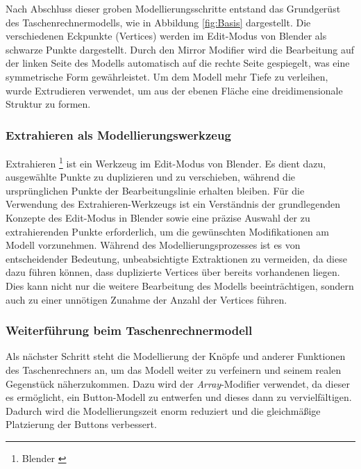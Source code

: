 Nach Abschluss dieser groben Modellierungsschritte entstand das Grundgerüst des Taschenrechnermodells, wie in
Abbildung \ref{fig:Basis} dargestellt. Die verschiedenen Eckpunkte (Vertices) werden im Edit-Modus von Blender als
schwarze Punkte dargestellt. Durch den Mirror Modifier wird die Bearbeitung auf der linken Seite des Modells
automatisch auf die rechte Seite gespiegelt, was eine symmetrische Form gewährleistet. Um dem Modell mehr Tiefe zu
verleihen, wurde Extrudieren verwendet, um aus der ebenen Fläche eine dreidimensionale Struktur zu formen.

\subsubsection*{Extrahieren als Modellierungswerkzeug}
Extrahieren \footnote{Blender \cite{Extrahieren}} ist ein Werkzeug im Edit-Modus von Blender. Es dient dazu,
ausgewählte Punkte zu duplizieren und zu verschieben, während die ursprünglichen Punkte der Bearbeitungslinie erhalten bleiben.
Für die Verwendung des Extrahieren-Werkzeugs ist ein Verständnis der grundlegenden Konzepte des Edit-Modus in Blender
sowie eine präzise Auswahl der zu extrahierenden Punkte erforderlich, um die gewünschten Modifikationen am Modell
vorzunehmen. Während des Modellierungsprozesses ist es von entscheidender Bedeutung, unbeabsichtigte Extraktionen zu
vermeiden, da diese dazu führen können, dass duplizierte Vertices über bereits vorhandenen liegen. Dies kann nicht
nur die weitere Bearbeitung des Modells beeinträchtigen, sondern auch zu einer unnötigen Zunahme der Anzahl der
Vertices führen.

\subsubsection*{Weiterführung beim Taschenrechnermodell}
Als nächster Schritt steht die Modellierung der Knöpfe und anderer Funktionen des Taschenrechners an, um das Modell
weiter zu verfeinern und seinem realen Gegenstück näherzukommen. Dazu wird der \textit{Array}-Modifier verwendet, da
dieser es ermöglicht, ein Button-Modell zu entwerfen und dieses dann zu vervielfältigen. Dadurch wird die
Modellierungszeit enorm reduziert und die gleichmäßige Platzierung der Buttons verbessert.

